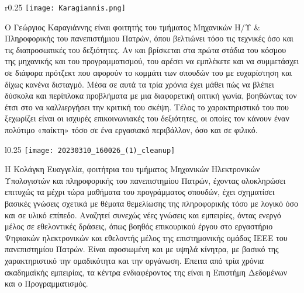 \documentclass{report}
\begin{document}
\begin{wrapfigure}{r}{0.25\textwidth} %
    \centering
    \texttt{[image: Karagiannis.png]}
\end{wrapfigure}
Ο Γεώργιος Καραγιάννης είναι φοιτητής του τμήματος Μηχανικών Η/Υ & Πληροφορικής του πανεπιστήμιου Πατρών, όπου βελτιώνει τόσο τις τεχνικές όσο και τις  διαπροσωπικές του δεξιότητες. Αν και βρίσκεται στα πρώτα στάδια του κόσμου της μηχανικής και του προγραμματισμού, του αρέσει να εμπλέκετε και να συμμετάσχει σε διάφορα πρότζεκτ που αφορούν το κομμάτι των σπουδών του με ευχαρίστηση και δίχως κανένα δισταγμό. Μέσα σε αυτά τα τρία χρόνια έχει μάθει πώς να βλέπει δύσκολα και περίπλοκα προβλήματα με μια διαφορετική οπτική γωνία, βοηθώντας τον έτσι στο να καλλιεργήσει την κριτική του σκέψη. Τέλος το χαρακτηριστικό του που ξεχωρίζει είναι οι ισχυρές επικοινωνιακές του δεξιότητες, οι οποίες τον κάνουν έναν πολύτιμο «παίκτη» τόσο σε ένα εργασιακό περιβάλλον, όσο και σε φιλικό.

\vspace{10mm}
\begin{wrapfigure}{l}{0.25\textwidth} %
    \centering
    \texttt{[image: 20230310\_160026\_(1)\_cleanup]}
\end{wrapfigure}
Η Κολάγκη Ευαγγελία, φοιτήτρια του τμήματος Μηχανικών Ηλεκτρονικών Υπολογιστών και
πληροφορικής του πανεπιστημίου Πατρών, έχοντας ολοκληρώσει επιτυχώς τα
μέχρι τώρα μαθήματα του προγράμματος σπουδών, έχει σχηματίσει βασικές
γνώσεις σχετικά με θέματα θεμελίωσης της πληροφορικής τόσο με λογικό όσο και
σε υλικό επίπεδο. Αναζητεί συνεχώς νέες γνώσεις και εμπειρίες, όντας ενεργό
μέλος σε εθελοντικές δράσεις, όπως βοηθός επικουρικού έργου στο εργαστήριο
Ψηφιακών ηλεκτρονικών και εθελοντής μέλος της επιστημονικής ομάδας IEEE του
πανεπιστημίου Πατρών. Είναι αφοσιωμένη και με υψηλά κίνητρα, με βασικό της
χαρακτηριστικό την ομαδικότητα και την οργάνωση. Έπειτα από τρία χρόνια
ακαδημαϊκής εμπειρίας, τα κέντρα ενδιαφέροντος της είναι η Επιστήμη
Δεδομένων και ο Προγραμματισμός.
\vspace{5mm}
\end{document}
